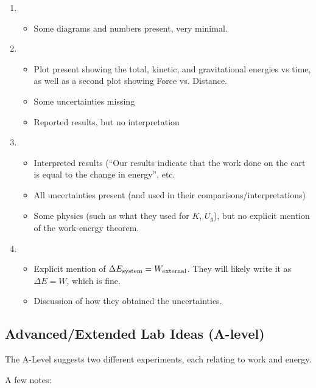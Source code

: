 \documentclass[fleqn,letterpaper]{article}
\begin{document}
\begin{enumerate}
 \item{
  \begin{itemize}
   \item{Some diagrams and numbers present, very minimal.}
  \end{itemize}
}
 \item{
  \begin{itemize}
   \item{Plot present showing the total, kinetic, and gravitational energies vs time, as well as a second plot showing Force vs. Distance.}
   \item{Some uncertainties missing}
   \item{Reported results, but no interpretation}
  \end{itemize}
}
 \item{
  \begin{itemize}
   \item{Interpreted results (``Our results indicate that the work done on the cart is equal to the change in energy'', etc.}
   \item{All uncertainties present (and used in their comparisons/interpretations)}
   \item{Some physics (such as what they used for $K$, $U_g$), but no explicit mention of the work-energy theorem.}
  \end{itemize}
}
 \item{
  \begin{itemize}
   \item{Explicit mention of $\Delta E_{\rm system} = W_{\rm external}$.  They will likely write it as $\Delta E = W$, which is fine.}
   \item{Discussion of how they obtained the uncertainties.}
  \end{itemize}
}
\end{enumerate}


\subsection*{Advanced/Extended Lab Ideas (A-level)}

The A-Level suggests two different experiments, each relating to work and energy.

A few notes:
\end{document}
